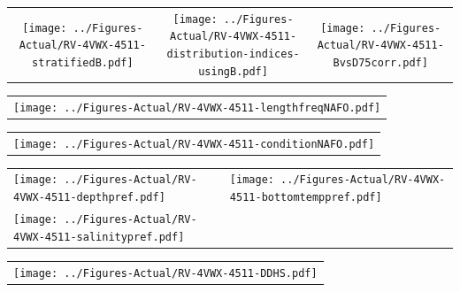 \documentclass[12pt]{article}\usepackage[]{graphicx}\usepackage[]{color}
\begin{document}
\vspace{1cm}
\begin{minipage}{1.0\textwidth}
 \begin{tabular}{ccc}
\texttt{[image: ../Figures-Actual/RV-4VWX-4511-stratifiedB.pdf]} & 
\texttt{[image: ../Figures-Actual/RV-4VWX-4511-distribution-indices-usingB.pdf]} & 
\texttt{[image: ../Figures-Actual/RV-4VWX-4511-BvsD75corr.pdf]} \\ 
\end{tabular} 
\end{minipage}
\clearpage
\begin{minipage}{1.0\textwidth}
 \begin{tabular}{c}
\texttt{[image: ../Figures-Actual/RV-4VWX-4511-lengthfreqNAFO.pdf]} \\ 
\end{tabular} 
\end{minipage}
\newline

\vspace{1cm}
\begin{minipage}{1.0\textwidth}
 \begin{tabular}{c}
\texttt{[image: ../Figures-Actual/RV-4VWX-4511-conditionNAFO.pdf]} \\ 
\end{tabular} 
\end{minipage}
\clearpage
\begin{minipage}{1.0\textwidth}
 \begin{tabular}[t]{m{3in}m{3in}}
\texttt{[image: ../Figures-Actual/RV-4VWX-4511-depthpref.pdf]} & 
\texttt{[image: ../Figures-Actual/RV-4VWX-4511-bottomtemppref.pdf]} \\ 
\texttt{[image: ../Figures-Actual/RV-4VWX-4511-salinitypref.pdf]} & 
 \\ 
\end{tabular} 
\end{minipage}
\newline

\vspace{1cm}
\begin{minipage}{1.0\textwidth}
 \begin{tabular}{c}
\texttt{[image: ../Figures-Actual/RV-4VWX-4511-DDHS.pdf]} \\ 
\end{tabular} 
\end{minipage}
\clearpage
\end{document}
